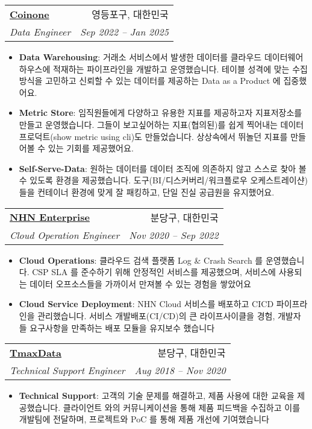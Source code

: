 \documentclass[letterpaper,11pt]{article}
\makeatletter
\newcommand{\resumeItem}[2]{
  \item\small{
    \textbf{#1}{: #2 \vspace{-2pt}}
  }
}
\newcommand{\resumeSubheading}[4]{
  \vspace{-1pt}\item
    \begin{tabular*}{0.97\textwidth}[t]{l@{\extracolsep{\fill}}r}
      \textbf{#1} & #2 \\
      \textit{\small#3} & \textit{\small #4} \\
    \end{tabular*}\vspace{-5pt}
}
\newcommand{\resumeSubSubheading}[2]{
    \begin{tabular*}{0.97\textwidth}{l@{\extracolsep{\fill}}r}
      \textit{\small#1} & \textit{\small #2} \\
    \end{tabular*}\vspace{-5pt}
}
\newcommand{\resumeItemListStart}{\begin{itemize}}
\newcommand{\resumeItemListEnd}{\end{itemize}\vspace{-5pt}}
\makeatother
\begin{document}


    \resumeSubheading
      {\href{https://www.jx2lee.kr/career/coinone}{Coinone}}{영등포구, 대한민국}
      {Data Engineer}{Sep 2022 -- Jan 2025}
      \resumeItemListStart
        \resumeItem{Data Warehousing}
          {거래소 서비스에서 발생한 데이터를 클라우드 데이터웨어하우스에 적재하는 파이프라인을 개발하고 운영했습니다. 테이블 성격에 맞는 수집방식을 고민하고 신뢰할 수 있는 데이터를 제공하는 Data as a Product 에 집중했어요.}
        \resumeItem{Metric Store}
          {임직원들에게 다양하고 유용한 지표를 제공하고자 지표저장소를 만들고 운영했습니다. 그들이 보고싶어하는 지표(협의된)를 쉽게 찍어내는 데이터 프로덕트(show metric using cli)도 만들었습니다. 상상속에서 뛰놀던 지표를 만들어볼 수 있는 기회를 제공했어요.}
        \resumeItem{Self-Serve-Data}
          {원하는 데이터를 데이터 조직에 의존하지 않고 스스로 찾아 볼 수 있도록 환경을 제공했습니다. 도구(BI/디스커버리/워크플로우 오케스트레이샨)들을 컨테이너 환경에 맞게 잘 패킹하고, 단일 진실 공급원을 유지했어요.}
      \resumeItemListEnd

    \resumeSubheading
      {\href{https://www.jx2lee.kr/career/nhn-enterprise}{NHN Enterprise}}{분당구, 대한민국}
      {Cloud Operation Engineer}{Nov 2020 -- Sep 2022}
      \resumeItemListStart
        \resumeItem{Cloud Operations}
          {클라우드 검색 플랫폼 Log \& Crash Search 를 운영했습니다. CSP SLA 를 준수하기 위해 안정적인 서비스를 제공했으며, 서비스에 사용되는 데이터 오프소스들을 가까이서 만져볼 수 있는 경험을 쌓았어요}
        \resumeItem{Cloud Service Deployment}
          {NHN Cloud 서비스를 배포하고 CICD 파이프라인을 관리했습니다. 서비스 개발배포(CI/CD)의 큰 라이프사이클을 경험, 개발자들 요구사항을 만족하는 배포 모듈을 유지보수 했습니다}
      \resumeItemListEnd

    \resumeSubheading
      {\href{https://www.jx2lee.kr/career/tmax}{TmaxData}}{분당구, 대한민국}
      {Technical Support Engineer}{Aug 2018 -- Nov 2020}
      \resumeItemListStart
        \resumeItem{Technical Support}
          {고객의 기술 문제를 해결하고, 제품 사용에 대한 교육을 제공했습니다. 클라이언트 와의 커뮤니케이션을 통해 제품 피드백을 수집하고 이를 개발팀에 전달하며, 프로젝트와 PoC 를 통해 제품 개선에 기여했습니다}
      \resumeItemListEnd
\end{document}
